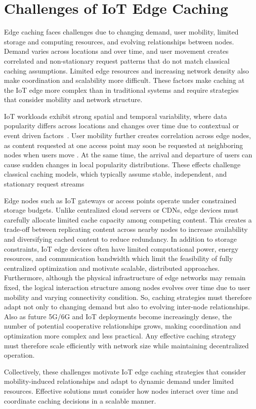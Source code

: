 \section{Challenges of IoT Edge Caching}

Edge caching faces challenges due to changing demand, user mobility, limited storage and computing resources, and evolving relationships between nodes. Demand varies across locations and over time, and user movement creates correlated and non-stationary request patterns that do not match classical caching assumptions. Limited edge resources and increasing network density also make coordination and scalability more difficult. These factors make caching at the IoT edge more complex than in traditional systems and require strategies that consider mobility and network structure.


IoT workloads exhibit strong spatial and temporal variability, where data popularity differs across locations and changes over time due to contextual or event driven factors~\cite{Satyanarayanan2017Edge,Chiang2016Fog}. User mobility further creates correlation across edge nodes, as content requested at one access point may soon be requested at neighboring nodes when users move \cite{Kotz2004Dartmouth}. At the same time, the arrival and departure of users can cause sudden changes in local popularity distributions. These effects challenge classical caching models, which typically assume stable, independent, and stationary request streams \cite{Podlipnig2003}


Edge nodes such as IoT gateways or access points operate under constrained storage budgets. Unlike centralized cloud servers or CDNs, edge devices must carefully allocate limited cache capacity among competing content. This creates a trade-off between replicating content across nearby nodes to increase availability and diversifying cached content to reduce redundancy. In addition to storage constraints, IoT edge devices often have limited computational power, energy resources, and communication bandwidth which limit the feasibility of fully centralized optimization and motivate scalable, distributed approaches. Furthermore, although the physical infrastructure of edge networks may remain fixed, the logical interaction structure among nodes evolves over time due to user mobility and varying connectivity condition. So, caching strategies must therefore adapt not only to changing demand but also to evolving inter-node relationships. Also as future 5G/6G and IoT deployments become increasingly dense, the number of potential cooperative relationships grows, making coordination and optimization more complex and less practical. Any effective caching strategy must therefore scale efficiently with network size while maintaining decentralized operation.

Collectively, these challenges motivate IoT edge caching strategies that consider mobility-induced relationships and adapt to dynamic demand under limited resources. Effective solutions must consider how nodes interact over time and coordinate caching decisions in a scalable manner.

